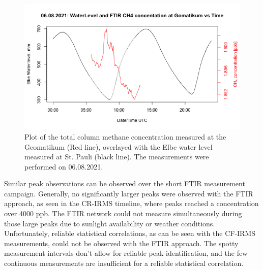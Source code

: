 \begin{figure}[htbp]
 \centering
 \includegraphics[width=1\textwidth]{figures/Appendix/FTIR/15_Basic_Plot_CH4_Wl_FTIR.png}
 \caption[FTIR methane concentration and water level height]{Plot of the total column methane concentration measured at the Geomatikum (Red line), overlayed with the Elbe water level measured at St. Pauli (black line). The measurements were performed on 06.08.2021.}
 \label{FTIRWL}
\end{figure}
Similar peak observations can be observed over the short FTIR measurement campaign. Generally, no significantly larger peaks were observed with the FTIR approach, as seen in the CR-IRMS timeline, where peaks reached a concentration over 4000 ppb. The FTIR network could not measure simultaneously during those large peaks due to sunlight availability or weather conditions.  Unfortunately, reliable statistical correlations, as can be seen with the CF-IRMS measurements, could not be observed with the FTIR approach. The spotty measurement intervals don't allow for reliable peak identification, and the few continuous measurements are insufficient for a reliable statistical correlation. 

